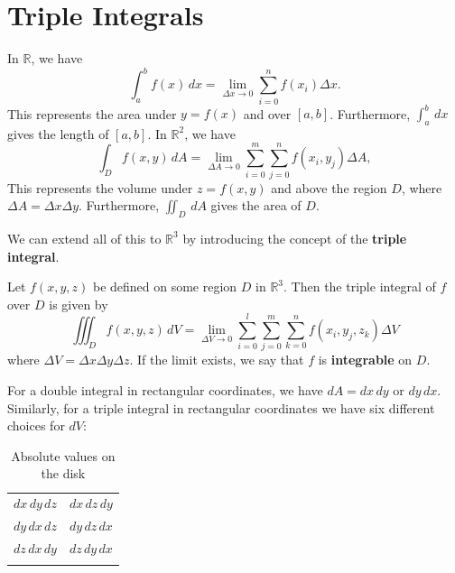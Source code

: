 \documentclass[10pt,]{book}
\newcommand{\terminology}[1]{\textbf{#1}}
\theoremstyle{ptxplainnotitle}
\theoremstyle{ptxplaintitle}
\theoremstyle{ptxplainnotitle}
\theoremstyle{ptxplaintitle}
\theoremstyle{ptxplainnotitle}
\theoremstyle{ptxplaintitle}
\theoremstyle{ptxdefinitionnotitle}
\theoremstyle{ptxdefinitiontitle}
\theoremstyle{ptxdefinitionnotitle}
\theoremstyle{ptxdefinitiontitle}
\theoremstyle{ptxdefinitionnotitle}
\theoremstyle{ptxdefinitiontitle}
\theoremstyle{ptxdefinitionnotitle}
\theoremstyle{ptxdefinitiontitle}
\theoremstyle{ptxdefinitionnotitle}
\theoremstyle{ptxdefinitiontitle}
\numberwithin{equation}{section}
\newcommand{\hrulethick} {\noalign{\hrule height 0.11em}}
\newcommand{\RR}{\mathbb{R}}
\begin{document}
\section[{Triple Integrals}]{Triple Integrals}\label{section-triple-integrals}
\hypertarget{p-1160}{}%
In \(\RR\), we have%
\begin{equation*}
\int_{a}^{b}f(x)\,dx = \lim_{\Delta x\to0}\sum_{i=0}^{n}f(x_{i})\Delta x.
\end{equation*}
This represents the area under \(y=f(x)\) and over \([a,b]\). Furthermore, \(\int_{a}^{b}\,dx\) gives the length of \([a,b]\). In \(\mathbb{R}^{2}\), we have%
\begin{equation*}
\int_{D}f(x,y)\,dA = \lim_{\Delta A\to0}\sum_{i=0}^{m}\sum_{j=0}^{n}f(x_{i},y_{j})\Delta A,
\end{equation*}
This represents the volume under \(z = f(x,y)\) and above the region \(D\), where \(\Delta A = \Delta x\Delta y\). Furthermore, \(\iint_{D}\,dA\) gives the area of \(D\).%
\par
\hypertarget{p-1161}{}%
We can extend all of this to \(\RR^{3}\) by introducing the concept of the \terminology{triple integral}.%
\begin{definition}\label{definition-triple-integrals-over-a-rectangle}
\hypertarget{p-1162}{}%
Let \(f(x,y,z)\) be defined on some region \(D\) in \(\RR^{3}\). Then the triple integral of \(f\) over \(D\) is given by%
\begin{equation*}
\iiint_{D}f(x,y,z)\,dV = \lim_{\Delta V\to0}\sum_{i=0}^{l}\sum_{j=0}^{m}\sum_{k=0}^{n}f(x_{i},y_{j},z_{k})\Delta V
\end{equation*}
where \(\Delta V = \Delta x\Delta y\Delta z\). If the limit exists, we say that \(f\) is \terminology{integrable} on \(D\).%
\end{definition}
\hypertarget{p-1163}{}%
For a double integral in rectangular coordinates, we have \(dA = dx\,dy\) or \(dy\,dx\). Similarly, for a triple integral in rectangular coordinates we have six different choices for \(dV\): \begin{table}
\centering
\begin{tabular}{cc}\hrulethick
\(dx\,dy\,dz\)&\(dx\,dz\,dy\)\tabularnewline[0pt]
\(dy\,dx\,dz\)&\(dy\,dz\,dx\)\tabularnewline[0pt]
\(dz\,dx\,dy\)&\(dz\,dy\,dx\)\tabularnewline\hrulethick
\end{tabular}
\caption{Absolute values on the disk\label{table-volume-elements}}
\end{table}
\end{document}
